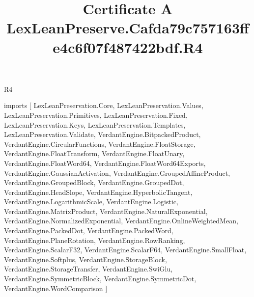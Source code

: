 \begin{lexlean}{R4}
\title{Certificate A LexLeanPreserve.Cafda79c757163ffe4c6f07f487422bdf.R4}
\begin{coremodule}
imports [
  LexLeanPreservation.Core,
  LexLeanPreservation.Values,
  LexLeanPreservation.Primitives,
  LexLeanPreservation.Fixed,
  LexLeanPreservation.Keys,
  LexLeanPreservation.Templates,
  LexLeanPreservation.Validate,
  VerdantEngine.BitpackedProduct,
  VerdantEngine.CircularFunctions,
  VerdantEngine.FloatStorage,
  VerdantEngine.FloatTransform,
  VerdantEngine.FloatUnary,
  VerdantEngine.FloatWord64,
  VerdantEngine.FloatWord64Exports,
  VerdantEngine.GaussianActivation,
  VerdantEngine.GroupedAffineProduct,
  VerdantEngine.GroupedBlock,
  VerdantEngine.GroupedDot,
  VerdantEngine.HeadSlope,
  VerdantEngine.HyperbolicTangent,
  VerdantEngine.LogarithmicScale,
  VerdantEngine.Logistic,
  VerdantEngine.MatrixProduct,
  VerdantEngine.NaturalExponential,
  VerdantEngine.NormalizedExponential,
  VerdantEngine.OnlineWeightedMean,
  VerdantEngine.PackedDot,
  VerdantEngine.PackedWord,
  VerdantEngine.PlaneRotation,
  VerdantEngine.RowRanking,
  VerdantEngine.ScalarF32,
  VerdantEngine.ScalarF64,
  VerdantEngine.SmallFloat,
  VerdantEngine.Softplus,
  VerdantEngine.StorageBlock,
  VerdantEngine.StorageTransfer,
  VerdantEngine.SwiGlu,
  VerdantEngine.SymmetricBlock,
  VerdantEngine.SymmetricDot,
  VerdantEngine.WordComparison
]


\end{coremodule}
\end{lexlean}
